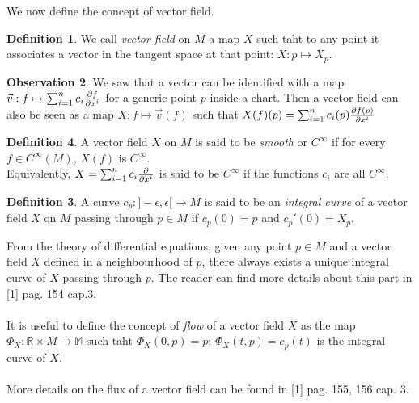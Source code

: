 \documentclass[12pt,a4paper]{report}
\theoremstyle{definition}
\newtheorem{Def}{Definition}[chapter]
\theoremstyle{Theorem}
\theoremstyle{definition}
\theoremstyle{definition}
\newtheorem{Obs}[Def]{Observation}
\begin{document}
		We now define the concept of vector field.
		\begin{Def}
			We call \textit{vector field} on $M$ a map $X$ such taht to any point it associates a vector in the tangent space at that point: $X:p\mapsto X_p$. 
		\end{Def}
		\begin{Obs}
			We saw that a vector can be identified with a map $\vec{v}:f\mapsto\sum_{i=1}^{n}c_i{\partial f\over \partial x^i}$ for a generic point $p$ inside a chart. Then a vector field can also be seen as a map $X:f\mapsto\vec{v}(f)$ such that $X(f)(p)=\sum_{i=1}^{n}c_i(p){\partial f(p)\over \partial x^i}$
		\end{Obs}
		\begin{Def}
			A vector field $X$ on $M$ is said to be \textit{smooth} or $C^\infty$ if for every $f\in C^\infty(M)$, $X(f)$ is $C^\infty$.
			\\
			Equivalently, $X=\sum_{i=1}^{n}c_i{\partial\over \partial x^i}$ is said to be $C^\infty$ if the functions $c_i$ are all $C^\infty$.
			\begin{Def}
				A curve $c_p:]-\epsilon,\epsilon[\rightarrow M$ is said to be an \textit{integral curve} of a vector field $X$ on $M$ passing through $p\in M$ if $c_p(0)=p$ and $c_p'(0)=X_p$.
			\end{Def}
			From the theory of differential equations, given any point $p\in M$ and a vector field $X$ defined in a neighbourhood of $p$, there always exists a unique integral curve of $X$ passing through $p$. The reader can find more details about this part in [1] pag. 154 cap.3.\\
			\\
			It is useful to define the concept of \textit{flow} of a vector field $X$ as the map $\Phi_X:\mathbb{R}\times M\rightarrow\mathbb{M}$ such taht $\Phi_X(0,p)=p$; $\Phi_X(t,p)=c_p(t)$ is the integral curve of $X$.\\
			\\
			More details on the flux of a vector field can be found in [1] pag. 155, 156 cap. 3.
		\end{Def}
\end{document}
